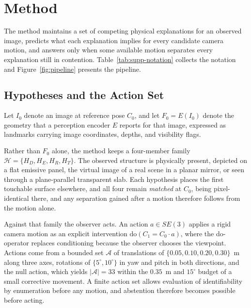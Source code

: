 \documentclass{article} %
\theoremstyle{defstyle}
\theoremstyle{plain}
\begin{document}
\section{Method}
\label{sec:method}

The method maintains a set of competing physical explanations for an observed image,
predicts what each explanation implies for every candidate camera motion, and answers only
when some available motion separates every explanation still in contention.
Table~\ref{tab:supp-notation} collects the notation and Figure~\ref{fig:pipeline} presents
the pipeline.

\subsection{Hypotheses and the Action Set}
\label{sec:formulation}

Let $I_0$ denote an image at reference pose $C_0$, and let $F_0 = E(I_0)$ denote the
geometry that a perception encoder $E$ reports for that image, expressed as landmarks
carrying image coordinates, depths, and visibility flags. \begin{definition}\label{def:hypotheses}
Rather than $F_0$ alone, the method keeps a four-member family
$\mathcal{H} = \{H_D, H_E, H_R, H_T\}$. The observed structure is physically present,
depicted on a flat emissive panel, the virtual image of a real scene in a planar
mirror, or seen through a plane-parallel transparent slab. Each hypothesis places the
first touchable surface elsewhere, and all four remain \emph{matched} at $C_0$, being
pixel-identical there, and any separation gained after a motion therefore follows from
the motion alone.
\end{definition} Against that family the observer acts. An action $a \in SE(3)$ applies a
rigid camera motion as an explicit intervention $\mathrm{do}(C_1 = C_0 \cdot a)$, where the
do-operator replaces conditioning because the observer chooses the viewpoint. Actions come
from a bounded set $\mathcal{A}$ of translations of $\{0.05, 0.10, 0.20, 0.30\}$~m along
three axes, rotations of $\{5^\circ, 10^\circ\}$ in yaw and pitch in both directions, and
the null action, which yields $|\mathcal{A}| = 33$ within the $0.35$~m and $15^\circ$ budget
of a small corrective movement. A finite action set allows evaluation of identifiability by
enumeration before any motion, and abstention therefore becomes possible before acting.
\end{document}
